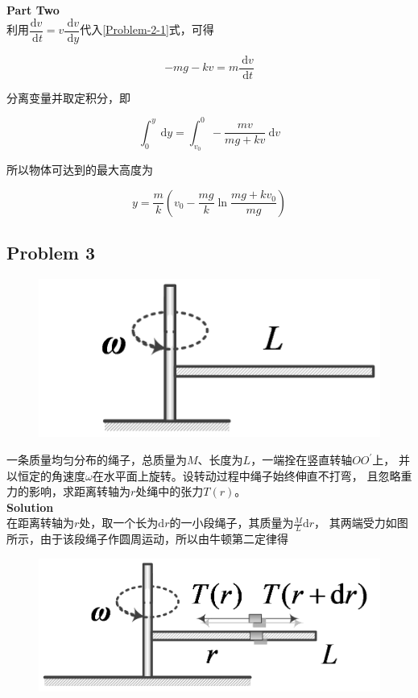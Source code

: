 \documentclass[
	12pt, %
	a4paper, %
]{myLegrandOrangeBook}
\newcommand{\rmd}{\mathrm{d}}
\begin{document}
    \textbf{Part Two}
    \\

    利用$\dfrac{\mathrm{d} v}{\mathrm{~d} t}=v \dfrac{\mathrm{~d} v}{\mathrm{~d} y}$代入\ref{Problem-2-1}式，可得

    $$
        -m g-k v=m \frac{\mathrm{~d} v}{\mathrm{~d} t}
    $$

    分离变量并取定积分，即

    $$
        \int_0^y \mathrm{~d} y=\int_{v_0}^0-\frac{m v}{m g+k v} \mathrm{~d} v
    $$

    所以物体可达到的最大高度为

    $$
        y=\frac{m}{k}\left(v_0-\frac{m g}{k} \ln \frac{m g+k v_0}{m g}\right)
    $$

\subsection{Problem 3}

    \begin{figure}
        \centering
        \includegraphics[scale=0.18]{"Chapter 02 images/pic5.png"}
        \label{pic5}
    \end{figure}

    一条质量均匀分布的绳子，总质量为\(M\)、长度为\(L\)，一端拴在竖直转轴\(OO^{'}\)上，
    并以恒定的角速度\(\omega\)在水平面上旋转。设转动过程中绳子始终伸直不打弯，
    且忽略重力的影响，求距离转轴为\(r\)处绳中的张力\(T\left(r\right)\)。
    \\

    \textbf{Solution}
    \\

    在距离转轴为\(r\)处，取一个长为\(\rmd r\)的一小段绳子，其质量为\(\frac{M}{L} \rmd r\)，
    其两端受力如图所示，由于该段绳子作圆周运动，所以由牛顿第二定律得

    \begin{figure}
        \centering
        \includegraphics[scale=0.18]{"Chapter 02 images/pic6.png"}
        \label{pic6}
    \end{figure}
\end{document}
